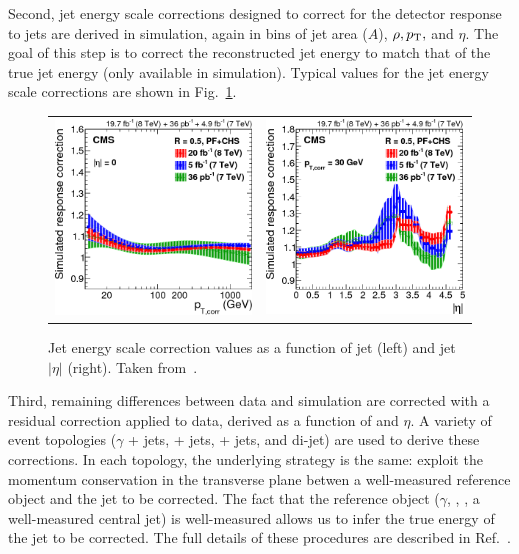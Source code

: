 Second, jet energy scale corrections designed to correct for the detector response to jets are derived in simulation, again in bins of jet area ($A$), $\rho, p_{\mathrm{T}},$ and $\eta$.
The goal of this step is to correct the reconstructed jet energy to match that of the true jet energy (only available in simulation).
Typical values for the jet energy scale corrections are shown in Fig.~\ref{fig:evt_jet_jec_corrections}. 
\begin{figure} [h!]
    \centering
    \begin{tabular}{c c}
        \includegraphics[width=0.48\linewidth]{figures/event_reconstruction_and_selection/jetmet8Tev_Figure_014-a.png} &
        \includegraphics[width=0.48\linewidth]{figures/event_reconstruction_and_selection/jetmet8Tev_Figure_014-b.png}
    \end{tabular}
    \caption{Jet energy scale correction values as a function of jet \pT (left) and jet $|\eta|$ (right). Taken from~\cite{Khachatryan_2017_jets}.}
    \label{fig:evt_jet_jec_corrections}
\end{figure}

Third, remaining differences between data and simulation are corrected with a residual correction applied to data, derived as a function of \pT and $\eta$.
A variety of event topologies ($\gamma$ + jets, \Zee + jets, \Zuu + jets, and di-jet) are used to derive these corrections.
In each topology, the underlying strategy is the same: exploit the momentum conservation in the transverse plane betwen a well-measured reference object and the jet to be corrected.
The fact that the reference object ($\gamma$, \Zee, \Zuu, a well-measured central jet) is well-measured allows us to infer the true energy of the jet to be corrected.
The full details of these procedures are described in Ref.~\cite{Khachatryan_2017_jets}.

